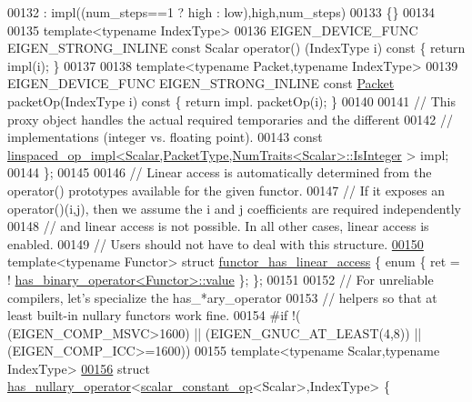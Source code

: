 \begin{DoxyCode}
00132     : impl((num\_steps==1 ? high : low),high,num\_steps)
00133   \{\}
00134 
00135   \textcolor{keyword}{template}<\textcolor{keyword}{typename} IndexType>
00136   EIGEN\_DEVICE\_FUNC EIGEN\_STRONG\_INLINE \textcolor{keyword}{const} Scalar operator() (IndexType i)\textcolor{keyword}{ const }\{ \textcolor{keywordflow}{return} impl(i); \}
00137 
00138   \textcolor{keyword}{template}<\textcolor{keyword}{typename} Packet,\textcolor{keyword}{typename} IndexType>
00139   EIGEN\_DEVICE\_FUNC EIGEN\_STRONG\_INLINE \textcolor{keyword}{const} \hyperlink{union_eigen_1_1internal_1_1_packet}{Packet} packetOp(IndexType i)\textcolor{keyword}{ const }\{ \textcolor{keywordflow}{return} impl.
      packetOp(i); \}
00140 
00141   \textcolor{comment}{// This proxy object handles the actual required temporaries and the different}
00142   \textcolor{comment}{// implementations (integer vs. floating point).}
00143   \textcolor{keyword}{const} \hyperlink{struct_eigen_1_1internal_1_1linspaced__op__impl}{linspaced\_op\_impl<Scalar,PacketType,NumTraits<Scalar>::IsInteger}
      > impl;
00144 \};
00145 
00146 \textcolor{comment}{// Linear access is automatically determined from the operator() prototypes available for the given
       functor.}
00147 \textcolor{comment}{// If it exposes an operator()(i,j), then we assume the i and j coefficients are required independently}
00148 \textcolor{comment}{// and linear access is not possible. In all other cases, linear access is enabled.}
00149 \textcolor{comment}{// Users should not have to deal with this structure.}
\hyperlink{struct_eigen_1_1internal_1_1functor__has__linear__access}{00150} \textcolor{keyword}{template}<\textcolor{keyword}{typename} Functor> \textcolor{keyword}{struct }\hyperlink{struct_eigen_1_1internal_1_1functor__has__linear__access}{functor\_has\_linear\_access} \{ \textcolor{keyword}{enum} \{ ret = !
      \hyperlink{struct_eigen_1_1internal_1_1has__binary__operator}{has\_binary\_operator<Functor>::value} \}; \};
00151 
00152 \textcolor{comment}{// For unreliable compilers, let's specialize the has\_*ary\_operator}
00153 \textcolor{comment}{// helpers so that at least built-in nullary functors work fine.}
00154 \textcolor{preprocessor}{#if !( (EIGEN\_COMP\_MSVC>1600) || (EIGEN\_GNUC\_AT\_LEAST(4,8)) || (EIGEN\_COMP\_ICC>=1600))}
00155 \textcolor{keyword}{template}<\textcolor{keyword}{typename} Scalar,\textcolor{keyword}{typename} IndexType>
\hyperlink{struct_eigen_1_1internal_1_1has__nullary__operator_3_01scalar__constant__op_3_01_scalar_01_4_00_01_index_type_01_4}{00156} \textcolor{keyword}{struct }\hyperlink{struct_eigen_1_1internal_1_1has__nullary__operator}{has\_nullary\_operator}<\hyperlink{struct_eigen_1_1internal_1_1scalar__constant__op}{scalar\_constant\_op}<Scalar>,IndexType> \{ \textcolor{keyword}{
}
\end{DoxyCode}

